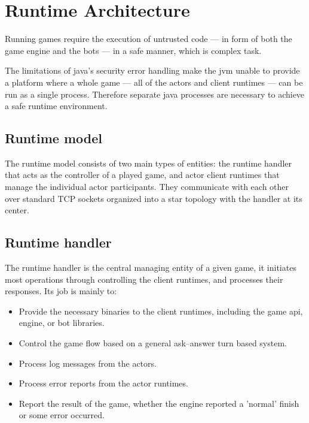 

%

\chapter{Runtime Architecture}\label{sect:RuntimeArch}

Running games require the execution of untrusted code --- in form of both the game engine and the bots --- in a safe manner, which is complex task.

The limitations of java's security error handling make the jvm unable to provide a platform where a whole game --- all of the actors and client runtimes --- can be run as a single process. Therefore separate java processes are necessary to achieve a safe runtime environment. 

	\section{Runtime model}
	
	The runtime model consists of two main types of entities: the runtime handler that acts as the controller of a played game, and actor client runtimes that manage the individual actor participants.   
	They communicate with each other over standard TCP sockets organized into a star topology with the handler at its center.
	
	\section{Runtime handler}
	
	The runtime handler is the central managing entity of a given game, it initiates most operations through controlling the client runtimes, and processes their responses. Its job is mainly to:
	
	\begin{itemize}
		\item Provide the necessary binaries to the client runtimes, including the game api, engine, or bot libraries.
	
		\item Control the game flow based on a general ask--answer turn based system.
		
		\item Process log messages from the actors.
	
		\item Process error reports from the actor runtimes.
		
		\item Report the result of the game, whether the engine reported a 'normal' finish or some error occurred.  
	\end{itemize}
	

